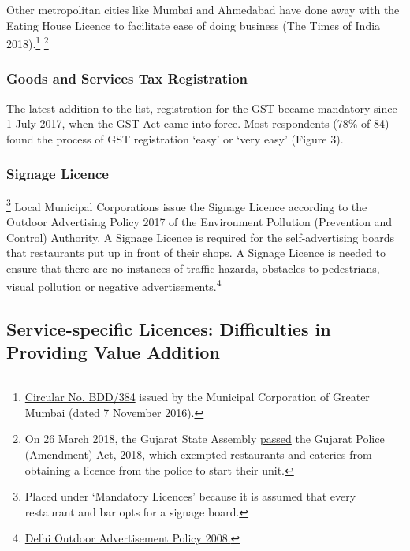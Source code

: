 \documentclass[a4paper, 12pt]{article}
\begin{document}
                   Other metropolitan cities like Mumbai and Ahmedabad have done away with the Eating House Licence to facilitate ease of doing business (The Times of India 2018).\footnote{\href{https://bit.ly/2xiMwpL}{Circular No. BDD/384} issued by the Municipal Corporation of Greater Mumbai (dated 7 November 2016).} \footnote{On 26 March 2018, the Gujarat State Assembly \href{https://bit.ly/2xktGyu}{passed} the Gujarat Police (Amendment) Act, 2018, which exempted restaurants and eateries from obtaining a licence from the police to start their unit.} %
                   

		\subsubsection{Goods and Services Tax Registration}
		The latest addition to the list, registration for the GST became mandatory since 1 July 2017, when the GST Act came into force. Most respondents (78\% of 84) found the process of GST registration ‘easy’ or ‘very easy’ (Figure 3).
		
		\subsubsection{Signage Licence}\footnote{Placed under ‘Mandatory Licences’ because it is assumed that every restaurant and bar opts for a signage board.}
		Local Municipal Corporations issue the Signage Licence according to the Outdoor Advertising Policy 2017 of the Environment Pollution (Prevention and Control) Authority. A Signage Licence is required for the self-advertising boards that restaurants put up in front of their shops. A Signage Licence is needed to ensure that there are no instances of traffic hazards, obstacles to pedestrians, visual pollution or negative advertisements.\footnote{\href{https://bit.ly/2xdiNzk}{Delhi Outdoor Advertisement Policy 2008.}}
		

		
		\subsection{Service-specific Licences: Difficulties in Providing Value Addition}
		
\end{document}
